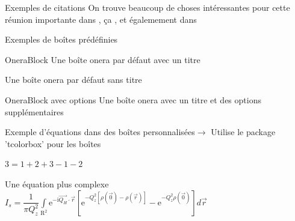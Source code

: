 \documentclass[compress,10pt,aspectratio=169]{beamer}
\begin{document}

\begin{frame}{Exemples de citations}
On trouve beaucoup de choses intéressantes pour cette réunion importante dans \cite{Lee_TGRS94}, ça \cite{Zebker_TGRS92,Rosen_IEEEProceedings00}, et égalemement dans \cite{Elfouhaily_JGR97,Elfouhaily_WRM03,Guerin_WRM10}
\end{frame}

\begin{frame}{Exemples de boîtes prédéfinies}
\begin{onerablock}{OneraBlock}
Une boîte onera par défaut avec un titre
\end{onerablock}

\begin{onerablock}{}
Une boîte onera par défaut sans titre
\end{onerablock}

\begin{center}
    \begin{onerablock}[hbox,drop fuzzy shadow=green!50!blue!50,colframe=red!50]{OneraBlock avec options}
        Une boîte onera avec un titre et des options supplémentaires
    \end{onerablock}
\end{center}
\end{frame}

\begin{frame}{Exemple d'équations dans des boîtes personnalisées}{$\rightarrow$ Utilise le package 'tcolorbox' pour les boîtes}
\bigcenter %
\begin{tcolorbox}[title={Une équation simple avec une tcolorbox de base}]
\centering
$3=1+2+3-1-2$
\end{tcolorbox}

\vspace{20pt}
\begin{onerablock}{Une équation plus complexe}
\centering
$
I_s=\dfrac{1}{\pi Q_z^2}\int\limits_{\mathrm{R}^2}\mathrm{e}^{-\mathrm{i}\vec{Q_H}\cdot\vec{r}}\left[\mathrm{e}^{-Q_z^2\left[\rho(\vec{0})-\rho(\vec{r})\right]}-\mathrm{e}^{-Q_z^2\rho(\vec{0})}\right]d\vec{r}
$
\end{onerablock}
\end{frame}
\end{document}
